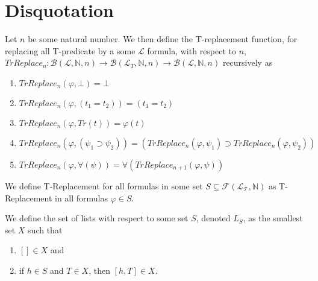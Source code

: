 \chapter{Disquotation}\label{chapter:disquotation}
\begin{definition}[T-Replacement]\label{def:T-Replacement}
\leanok
{}
    Let $n$ be some natural number. We then define the T-replacement function, for replacing all T-predicate by a some $\mathcal{L}$ formula, with respect to $n$, $TrReplace_n : \mathcal{B}(\mathcal{L},\mathbb{N},n) \to \mathcal{B}(\mathcal{L}_T,\mathbb{N},n) \to \mathcal{B}(\mathcal{L},\mathbb{N},n)$ recursively as
    \begin{enumerate}
    \item $TrReplace_n(\varphi,\bot) = \bot$
    \item $TrReplace_n(\varphi,(t_1 = t_2)) = (t_1 = t_2)$
    \item $TrReplace_n(\varphi,Tr(t)) = \varphi(t)$
    \item $TrReplace_n(\varphi,(\psi_1 \supset \psi_2)) = (TrReplace_n(\varphi,\psi_1) \supset TrReplace_n(\varphi,\psi_2))$
    \item $TrReplace_n(\varphi,\forall(\psi)) = \forall(TrReplace_{n + 1}(\varphi,\psi))$
    \end{enumerate}
\end{definition}

\begin{definition}\label{def:T-Replacement-Set}
\leanok
{}
We define T-Replacement for all formulas in some set $S \subseteq \mathcal{F}(\mathcal{L_T},\mathbb{N})$ as T-Replacement in all formulas $\varphi \in S$.
\end{definition}

\begin{definition}[$L$: List]\label{def:List}
    \leanok
    We define the set of lists with respect to some set $S$, denoted $L_S$, as the smallest set $X$ such that
    \begin{enumerate}
    \item $[] \in X$ and
    \item if $h \in S$ and $T \in X$, then $[h,T] \in X$.
    \end{enumerate}
\end{definition}

